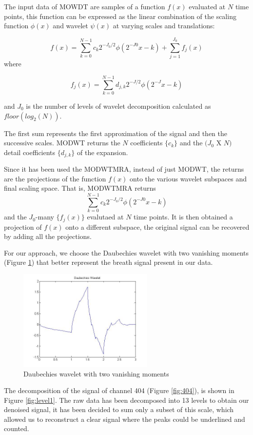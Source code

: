 The input data of MOWDT are samples of a function $f(x)$ evaluated at $N$ time points, this function can be expressed as the linear combination of the scaling function $\phi(x)$ and wavelet $\psi(x)$ at varying scales and translations:

$$f(x)=\sum_{k=0}^{N-1} c_k 2^{-J_0/2} \phi(2^{-J0}x-k) + \sum_{j=1}^{J_0}f_j(x)$$
where 

$$f_j(x)=\sum_{k=0}^{N-1} d_{j,k}2^{-J/2} \phi(2^{-J}x-k)$$

and $J_0$ is the number of levels of wavelet decomposition calculated as $floor(log_2(N))$.

The first sum represents the first approximation of the signal and then the successive scales.
MODWT returns the $N$ coefficients $\{c_k\}$ and the $(J_0 $ X $ N)$ detail coefficients $\{d_{j,k}\}$ of the expansion. 

Since it has been used the MODWTMRA, instead of just MODWT, the returns are the projections of the function $f(x)$ onto the various wavelet subspaces and final scaling space. That is, MODWTMRA returns 
$$\sum_{k=0}^{N-1} c_k 2^{-J_0/2} \phi(2^{-J0}x-k)$$\newline
and the $J_0$-many $\{f_j(x)\}$ evalutaed at $N$ time points.
It is then obtained a projection of $f(x)$ onto a different subspace, the original signal can be recovered by adding all the projections. 

For our approach, we choose the Daubechies wavelet with two vanishing moments (Figure \ref{fig:Daubechies}) that better represent the breath signal present in our data.

\begin{figure}[h]
    \centering
    \includegraphics[width=0.6\textwidth]{img/gooddb.jpeg}
    \caption{Daubechies wavelet with two vanishing moments}
    \label{fig:Daubechies}
\end{figure}


The decomposition of the signal of channel 404 (Figure \ref{fig:404}), is shown in Figure \ref{fig:level1}. The raw data has been decomposed into 13 levels to obtain our denoised signal, it has been decided to sum only a subset of this scale, which allowed us to reconstruct a clear signal where the peaks could be underlined and counted. 

